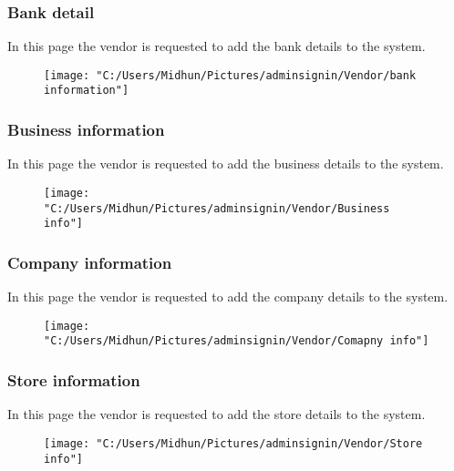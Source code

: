 \documentclass{beamer}
\begin{document}
\begin{frame}
\subsubsection{Bank detail}
In this page the vendor is requested to add the bank details to the system.
\begin{figure}[bph]
	\centering
	\texttt{[image: "C:/Users/Midhun/Pictures/adminsignin/Vendor/bank information"]}
	\label{fig:admin-signin}
\end{figure}


\end{frame}

\begin{frame}
	
\subsubsection{Business information}
In this page the vendor is requested to add the business details to the system.
\begin{figure}[bph]
	\centering
	\texttt{[image: "C:/Users/Midhun/Pictures/adminsignin/Vendor/Business info"]}
	\label{fig:admin-signin}
\end{figure}
	
\end{frame}
\subsubsection{Company information}
In this page the vendor is requested to add the company details to the system.
\begin{figure}[bph]
	\centering
	\texttt{[image: "C:/Users/Midhun/Pictures/adminsignin/Vendor/Comapny info"]}
	\label{fig:admin-signin}
\end{figure}

\begin{frame}
	
\subsubsection{Store information}
In this page the vendor is requested to add the store details to the system.
\begin{figure}[bph]
	\centering
	\texttt{[image: "C:/Users/Midhun/Pictures/adminsignin/Vendor/Store info"]}
	\label{fig:admin-signin}
\end{figure}
	
\end{frame}
\end{document}
